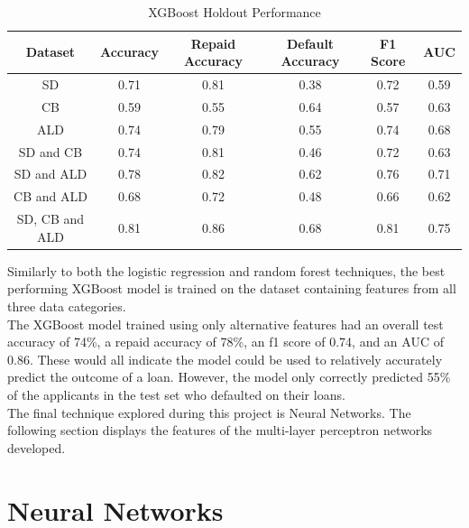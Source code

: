 \begin{table}[H]
\begin{center}
\begin{tabular}{|c|c|c|c|c|c|} 
\hline
\multicolumn{1}{|c|}{Dataset}
&\multicolumn{1}{|c|}{Accuracy}
&\multicolumn{1}{|c|}{Repaid Accuracy}
&\multicolumn{1}{|c|}{Default Accuracy}
&\multicolumn{1}{|c|}{F1 Score}
&\multicolumn{1}{|c|}{AUC}\\
\hline
SD & 0.71 & 0.81 & 0.38 & 0.72 & 0.59    \\
\hline
CB & 0.59 & 0.55 & 0.64 & 0.57 & 0.63    \\
\hline
ALD & 0.74 & 0.79 & 0.55 & 0.74 & 0.68    \\
\hline
SD and CB & 0.74 & 0.81 & 0.46 & 0.72 & 0.63    \\
\hline
SD and ALD & 0.78 & 0.82 & 0.62 & 0.76 & 0.71    \\
\hline
CB and ALD & 0.68 & 0.72 & 0.48 & 0.66 & 0.62    \\
\hline
SD, CB and ALD & 0.81 & 0.86 & 0.68 & 0.81 & 0.75    \\
\hline
\end{tabular}
\end{center}
\caption{XGBoost Holdout Performance}
\label{table:xgb test}
\end{table}

\vspace{10pt}

Similarly to both the logistic regression and random forest techniques, the best performing XGBoost model is trained on the dataset containing features from all three data categories. \\

The XGBoost model trained using only alternative features had an overall test accuracy of 74\%, a repaid accuracy of 78\%, an f1 score of 0.74, and an AUC of 0.86. These would all indicate the model could be used to relatively accurately predict the outcome of a loan. However, the model only correctly predicted 55\% of the applicants in the test set who defaulted on their loans.\\

The final technique explored during this project is Neural Networks. The following section displays the features of the multi-layer perceptron networks developed.

\section{Neural Networks}

